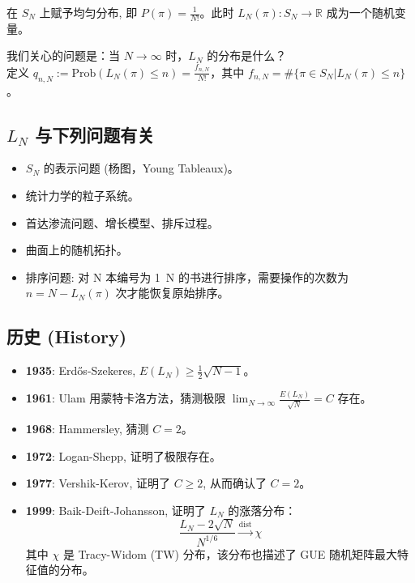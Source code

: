 在 $S_N$ 上赋予均匀分布, 即 $P(\pi) = \frac{1}{N!}$。此时 $L_N(\pi): S_N \to \mathbb{R}$ 成为一个随机变量。

我们关心的问题是：当 $N \to \infty$ 时，$L_N$ 的分布是什么？ \\
定义 $q_{n,N} := \text{Prob}(L_N(\pi) \le n) = \frac{f_{n,N}}{N!}$，其中 $f_{n,N} = \# \{ \pi \in S_N | L_N(\pi) \le n \}$。

\subsection*{$L_N$ 与下列问题有关}
\begin{itemize}
    \item $S_N$ 的表示问题 (杨图，Young Tableaux)。
    \item 统计力学的粒子系统。
    \item 首达渗流问题、增长模型、排斥过程。
    \item 曲面上的随机拓扑。
    \item 排序问题: 对 N 本编号为 1~N 的书进行排序，需要操作的次数为 $n = N - L_N(\pi)$ 次才能恢复原始排序。
\end{itemize}

\subsection*{历史 (History)}
\begin{itemize}
    \item \textbf{1935}: Erdős-Szekeres, $E(L_N) \ge \frac{1}{2}\sqrt{N-1}$。
    \item \textbf{1961}: Ulam 用蒙特卡洛方法，猜测极限 $\lim_{N \to \infty} \frac{E(L_N)}{\sqrt{N}} = C$ 存在。
    \item \textbf{1968}: Hammersley, 猜测 $C=2$。
    \item \textbf{1972}: Logan-Shepp, 证明了极限存在。
    \item \textbf{1977}: Vershik-Kerov, 证明了 $C \ge 2$, 从而确认了 $C=2$。
    \item \textbf{1999}: Baik-Deift-Johansson, 证明了 $L_N$ 的涨落分布：
    \[ \frac{L_N - 2\sqrt{N}}{N^{1/6}} \xrightarrow{\text{dist}} \chi \]
    其中 $\chi$ 是 Tracy-Widom (TW) 分布，该分布也描述了 GUE 随机矩阵最大特征值的分布。
\end{itemize}